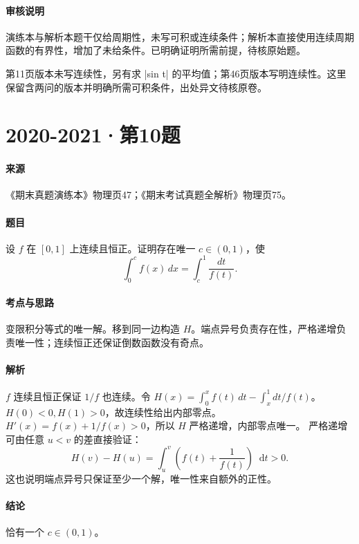 \documentclass[UTF8,fontset=fandol,12pt,oneside,openany]{ctexrep}
\newcommand{\dd}{\mathop{}\!\mathrm d}
\theoremstyle{definition}
\begin{document}
\paragraph{审核说明}
演练本与解析本题干仅给周期性，未写可积或连续条件；解析本直接使用连续周期函数的有界性，增加了未给条件。已明确证明所需前提，待核原始题。

第11页版本未写连续性，另有求 |sin t| 的平均值；第46页版本写明连续性。这里保留含两问的版本并明确所需可积条件，出处异文待核原卷。

\par\addvspace{18pt}\noindent\begin{minipage}{\linewidth}
\section{2020-2021·第10题}
\label{exam:11:q16}
\paragraph{来源} 《期末真题演练本》物理页47；《期末考试真题全解析》物理页75。
\paragraph{题目}
设 $f$ 在 $[0,1]$ 上连续且恒正。证明存在唯一 $c\in(0,1)$，使
\[\int_0^cf(x)\,dx=\int_c^1\frac{dt}{f(t)}.\]
\end{minipage}\par
\paragraph{考点与思路}
变限积分等式的唯一解。移到同一边构造 $H$。端点异号负责存在性，严格递增负责唯一性；连续恒正还保证倒数函数没有奇点。
\paragraph{解析}
$f$ 连续且恒正保证 $1/f$ 也连续。令 $H(x)=\int_0^xf(t)\,dt-\int_x^1dt/f(t)$。$H(0)<0,H(1)>0$，故连续性给出内部零点。$H'(x)=f(x)+1/f(x)>0$，所以 $H$ 严格递增，内部零点唯一。
严格递增可由任意 $u<v$ 的差直接验证：
\[
H(v)-H(u)=\int_u^v\left(f(t)+\frac1{f(t)}\right)\dd t>0.
\]
这也说明端点异号只保证至少一个解，唯一性来自额外的正性。
\paragraph{结论}
恰有一个 $c\in(0,1)$。
\end{document}
